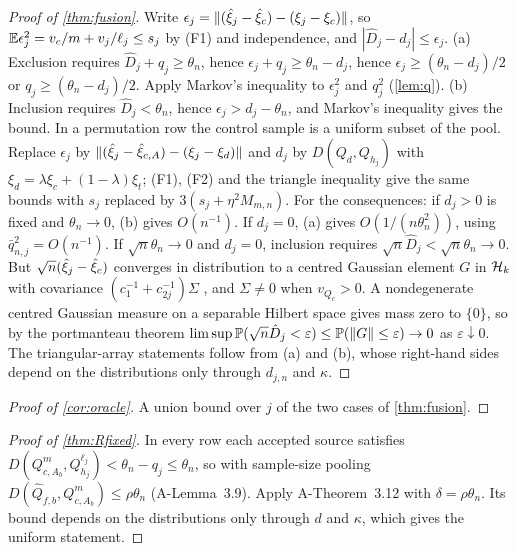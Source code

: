 \documentclass[11pt,a4paper]{article}
\begin{document}
\begin{proof}[Proof of \cref{thm:fusion}]
Write $\epsilon_j=\lVert (\hat\xi_j-\hat\xi_c)-(\xi_j-\xi_c)\rVert$, so $\mathbb{E}\epsilon_j^2=v_c/m+v_j/\ell_j\le s_j$ by (F1) and independence, and $|\hat D_j-d_j|\le\epsilon_j$.
(a) Exclusion requires $\hat D_j+q_j\ge\theta_n$, hence $\epsilon_j+q_j\ge\theta_n-d_j$, hence $\epsilon_j\ge(\theta_n-d_j)/2$ or $q_j\ge(\theta_n-d_j)/2$. Apply Markov's inequality to $\epsilon_j^2$ and $q_j^2$ (\cref{lem:q}).
(b) Inclusion requires $\hat D_j<\theta_n$, hence $\epsilon_j>d_j-\theta_n$, and Markov's inequality gives the bound.
In a permutation row the control sample is a uniform subset of the pool. Replace $\epsilon_j$ by $\lVert (\hat\xi_j-\hat\xi_{c,A})-(\xi_j-\xi_{d})\rVert$ and $d_j$ by $D(Q_d,Q_{h_j})$ with $\xi_d=\lambda\xi_c+(1-\lambda)\xi_t$; (F1), (F2) and the triangle inequality give the same bounds with $s_j$ replaced by $3(s_j+\eta^2M_{m,n})$.
For the consequences: if $d_j>0$ is fixed and $\theta_n\to0$, (b) gives $O(n^{-1})$. If $d_j=0$, (a) gives $O(1/(n\theta_n^2))$, using $\bar q_{n,j}^2=O(n^{-1})$. If $\sqrt n\theta_n\to0$ and $d_j=0$, inclusion requires $\sqrt n\hat D_j<\sqrt n\theta_n\to0$. But $\sqrt n(\hat\xi_j-\hat\xi_c)$ converges in distribution to a centred Gaussian element $G$ in $\mathcal{H}_k$ with covariance $(c_1^{-1}+c_{2j}^{-1})\Sigma$ \citep[Hilbert-space CLT; see][]{yang2026}, and $\Sigma\neq0$ when $v_{Q_c}>0$. A nondegenerate centred Gaussian measure on a separable Hilbert space gives mass zero to $\{0\}$, so by the portmanteau theorem $\limsup\mathbb{P}(\sqrt n\hat D_j<\varepsilon)\le\mathbb{P}(\lVert G\rVert\le\varepsilon)\to0$ as $\varepsilon\downarrow0$. The triangular-array statements follow from (a) and (b), whose right-hand sides depend on the distributions only through $d_{j,n}$ and $\kappa$.
\end{proof}

\begin{proof}[Proof of \cref{cor:oracle}]
A union bound over $j$ of the two cases of \cref{thm:fusion}.
\end{proof}

\begin{proof}[Proof of \cref{thm:Rfixed}]
In every row each accepted source satisfies $D(Q^m_{c,A_b},Q^{\ell_j}_{h_j})<\theta_n-q_j\le\theta_n$, so with sample-size pooling $D(\hat Q_{f,b},Q^m_{c,A_b})\le\rho\theta_n$ (A-Lemma~3.9). Apply A-Theorem~3.12 with $\delta=\rho\theta_n$. Its bound depends on the distributions only through $d$ and $\kappa$, which gives the uniform statement.
\end{proof}
\end{document}
